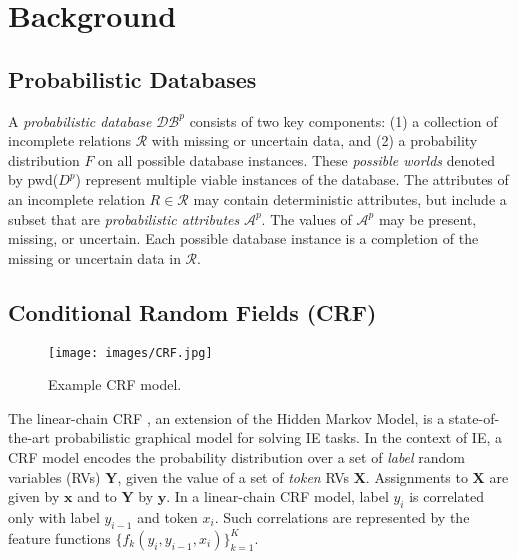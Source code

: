 \section{Background}

\subsection{Probabilistic Databases}

A \textit{probabilistic database} $\mathcal{DB}^{p}$ consists of two key components: (1) a collection of incomplete relations $\mathcal{R}$ with missing or uncertain data, and (2) a probability distribution $F$ on all possible database instances.  These \textit{possible worlds} denoted by pwd($D^{p}$) represent multiple viable instances of the database.  The attributes of an incomplete relation $R \in \mathcal{R}$ may contain deterministic attributes, but include a subset that are \textit{probabilistic attributes} $\mathcal{A}^{p}$.  The values of $\mathcal{A}^{p}$ may be present, missing, or uncertain.  Each possible database instance is a completion of the missing or uncertain data in $\mathcal{R}$.

\subsection{Conditional Random Fields (CRF)}
\begin{figure}
		\texttt{[image: images/CRF.jpg]}
		\label{fig:CRF}
		\caption{Example CRF model.} 
\end{figure}

The linear-chain CRF \cite{DBLP:conf/icml/LaffertyMP01,sutton06introduction}, an extension of the Hidden Markov Model, is a state-of-the-art probabilistic graphical model for solving IE tasks.  In the context of IE, a CRF model encodes the probability distribution over a set of \textit{label} random variables (RVs) $\mathbf{Y}$, given the value of a set of \textit{token} RVs $\mathbf{X}$.  Assignments to $\mathbf{X}$ are given by $\mathbf{x}$ and to $\mathbf{Y}$ by $\mathbf{y}$.  In a linear-chain CRF model, label $y_{i}$ is correlated only with label $y_{i-1}$ and token $x_{i}$.  Such correlations are represented by the feature functions $\{f_{k}(y_{i},y_{i-1},x_{i})\}^{K}_{k=1}$.


